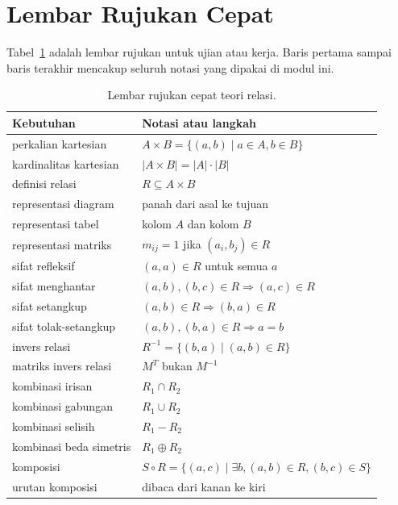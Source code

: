 \documentclass[11pt,a4paper]{article}
\begin{document}
\section{Lembar Rujukan Cepat}

Tabel~\ref{tab:rujukan-cepat} adalah lembar rujukan untuk ujian atau kerja. Baris pertama sampai baris terakhir mencakup seluruh notasi yang dipakai di modul ini.

\begin{table}[H]
	\centering
	\caption{Lembar rujukan cepat teori relasi.}
	\label{tab:rujukan-cepat}
	\footnotesize
	\begin{tabularx}{\textwidth}{l X}
		\toprule
		Kebutuhan               & Notasi atau langkah                                            \\
		\midrule
		perkalian kartesian     & $A \times B=\{(a,b) \mid a \in A, b \in B\}$                   \\
		kardinalitas kartesian  & $|A \times B|=|A| \cdot |B|$                                   \\
		definisi relasi         & $R \subseteq A \times B$                                       \\
		representasi diagram    & panah dari asal ke tujuan                                      \\
		representasi tabel      & kolom $A$ dan kolom $B$                                        \\
		representasi matriks    & $m_{ij}=1$ jika $(a_i,b_j) \in R$                              \\
		sifat refleksif         & $(a,a) \in R$ untuk semua $a$                                  \\
		sifat menghantar        & $(a,b),(b,c) \in R \Rightarrow (a,c) \in R$                    \\
		sifat setangkup         & $(a,b) \in R \Rightarrow (b,a) \in R$                          \\
		sifat tolak-setangkup   & $(a,b),(b,a) \in R \Rightarrow a=b$                            \\
		invers relasi           & $R^{-1}=\{(b,a) \mid (a,b) \in R\}$                            \\
		matriks invers relasi   & $M^T$ bukan $M^{-1}$                                           \\
		kombinasi irisan        & $R_1 \cap R_2$                                                 \\
		kombinasi gabungan      & $R_1 \cup R_2$                                                 \\
		kombinasi selisih       & $R_1-R_2$                                                      \\
		kombinasi beda simetris & $R_1 \oplus R_2$                                               \\
		komposisi               & $S \circ R=\{(a,c) \mid \exists b, (a,b) \in R, (b,c) \in S\}$ \\
		urutan komposisi        & dibaca dari kanan ke kiri                                      \\
		\bottomrule
	\end{tabularx}
\end{table}
\end{document}
